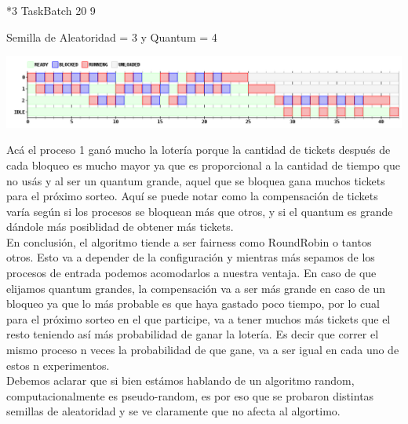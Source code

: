 \begin {center}
*3 TaskBatch 20 9
\end {center}
Semilla de Aleatoridad = 3 y Quantum = 4
\begin {center}
\includegraphics[width=16cm]{../simusched/outputs/ej8/sl-ej8-1-2.png}
\end {center}
Acá el proceso 1 ganó mucho la lotería porque la cantidad de tickets después de cada bloqueo es mucho mayor ya que es proporcional a la cantidad de tiempo que no usás y al ser un quantum grande, 
aquel que se bloquea gana muchos tickets para el próximo sorteo. Aquí se puede notar como la compensación de tickets varía según si los procesos se bloquean más que otros, y si el quantum es grande
dándole más posiblidad de obtener más tickets.\\

En conclusión, el algoritmo tiende a ser fairness como RoundRobin o tantos otros. Esto va a depender de la configuración y mientras más sepamos de los procesos de entrada podemos acomodarlos a nuestra ventaja.
En caso de que elijamos quantum grandes, la compensación va a ser más grande en caso de un bloqueo ya que lo más probable es que haya gastado poco tiempo, por lo cual para el próximo sorteo en el que 
participe, va a tener
muchos más tickets que el resto teniendo así más probabilidad de ganar la lotería.
Es decir que correr el mismo proceso n veces la probabilidad de que gane, va a ser igual en cada uno de estos n experimentos.\\
Debemos aclarar que si bien estámos hablando de un algoritmo random, computacionalmente es pseudo-random, es por eso que se probaron distintas semillas de aleatoridad y se ve claramente que no afecta al 
algortimo.


